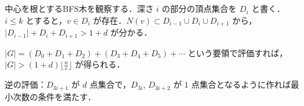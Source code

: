 \subsection{}
中心を根とするBFS木を観察する．深さ $i$ の部分の頂点集合を $D_i$ と書く．
$i \leq k$ とすると，$v\in D_i$ が存在．$N(v) \subset D_{i-1}\cup D_i\cup D_{i+1}$ から，
$|D_{i-1}| + D_i + D_{i+1} > 1 + d$ が分かる．

$|G| = (D_0+D_1+D_2) + (D_3+D_4+D_5)+\cdots$ という要領で評価すれば，$|G| > (1+d)\lfloor\frac{n}{e}\rfloor$ が得られる．

逆の評価：$D_{3i+1}$ が $d$ 点集合で，$D_{3i}$, $D_{3i+2}$ が $1$ 点集合となるように作れば最小次数の条件を満たす．